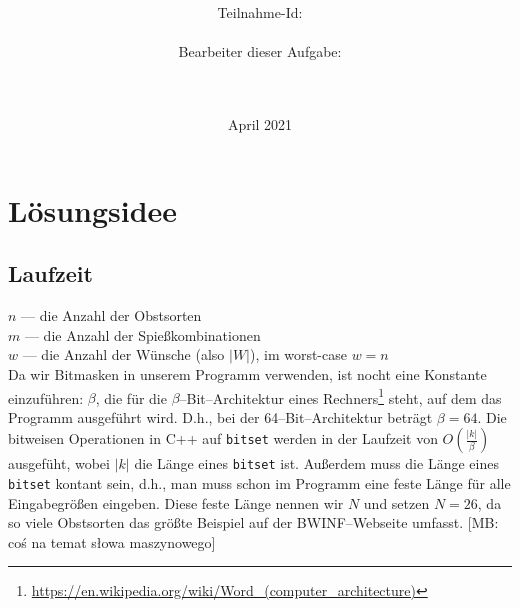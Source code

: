 \documentclass[a4paper,10pt,ngerman]{scrartcl}
\title{\textbf{\Huge\Aufgabe}}
\author{\LARGE Teilnahme-Id: \LARGE \TeilnahmeId \\\\
	    \LARGE Bearbeiter dieser Aufgabe: \\ 
	    \LARGE \Namen\\\\}
\date{\LARGE April 2021}
\newcommand{\mb}[1]{{\color{red}[MB: #1]}}
\newcommand{\ttt}[1]{\texttt{#1}}
\begin{document}
\maketitle
\tableofcontents

\section{Lösungsidee}










\subsection{Laufzeit}\label{sec:laufzeit}
$n$ --- die Anzahl der Obstsorten\\
$m$ --- die Anzahl der Spießkombinationen\\
$w$ --- die Anzahl der Wünsche (also $|W|$), im worst-case $w = n$\\

Da wir Bitmasken in unserem Programm verwenden, ist nocht eine Konstante einzuführen: $\beta$,
die für die $\beta$--Bit--Architektur eines Rechners\footnote{\href{https://en.wikipedia.org/wiki/Word_(computer_architecture)}{https://en.wikipedia.org/wiki/Word\_(computer\_architecture)}}
steht, auf dem das Programm ausgeführt wird. D.h., bei der 64--Bit--Architektur beträgt $\beta = 64$.
Die bitweisen Operationen in C++ auf \ttt{bitset} werden in der Laufzeit von $O(\frac{|k|}{\beta})$
ausgefüht, wobei $|k|$ die Länge eines \ttt{bitset} ist. Außerdem muss die Länge eines \ttt{bitset}
kontant sein, d.h., man muss schon im Programm eine feste Länge für alle Eingabegrößen eingeben.
Diese feste Länge nennen wir $N$ und setzen $N =26$, da so viele Obstsorten das größte Beispiel
auf der BWINF--Webseite umfasst.
\mb{coś na temat słowa maszynowego}\\
\end{document}
